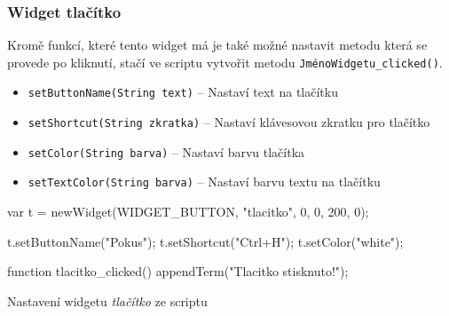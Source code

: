 \documentclass[12pt, a4paper, oneside]{article}
\newcommand{\It}{\textit}  %
\begin{document}
\subsubsection*{Widget tlačítko}
Kromě funkcí, které tento widget má je také možné nastavit metodu která se provede po kliknutí, stačí ve scriptu vytvořit metodu {\color{blue}\verb/JménoWidgetu_clicked()/}.
\begin{itemize}
    \item {\color{blue}\verb/setButtonName(String text)/} -- Nastaví text na tlačítku
    \item {\color{blue}\verb/setShortcut(String zkratka)/} -- Nastaví klávesovou zkratku pro tlačítko
    \item {\color{blue}\verb/setColor(String barva)/} -- Nastaví barvu tlačítka
    \item {\color{blue}\verb/setTextColor(String barva)/} -- Nastaví barvu textu na tlačítku
\end{itemize}

\begin{listing}[H]
\begin{jscode}
var t = newWidget(WIDGET_BUTTON, "tlacitko", 0, 0, 200, 0);

t.setButtonName("Pokus");
t.setShortcut("Ctrl+H");
t.setColor("white");

function tlacitko_clicked() {
    appendTerm("Tlacitko stisknuto!\n");
}
\end{jscode}
\caption{Nastavení widgetu \It{tlačítko} ze scriptu}
\end{listing}

\newpage
\end{document}
